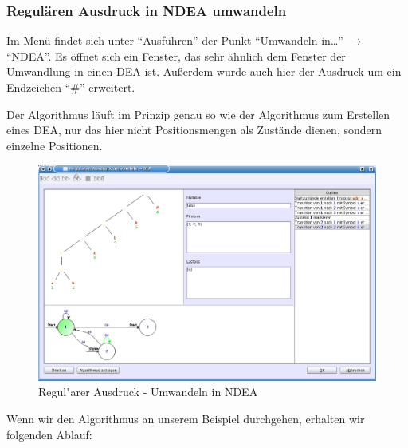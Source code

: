 \subsubsection{Regulären Ausdruck in NDEA umwandeln}

Im Menü findet sich unter "`Ausführen"' der Punkt "`Umwandeln in\ldots"' $\rightarrow$"`NDEA"'. Es öffnet sich ein Fenster, das sehr ähnlich dem Fenster der Umwandlung in einen DEA ist. Außerdem wurde auch hier der Ausdruck um ein Endzeichen "`\#"' erweitert.

Der Algorithmus läuft im Prinzip genau so wie der Algorithmus zum Erstellen eines DEA, nur das hier nicht Positionsmengen als Zustände dienen, sondern einzelne Positionen.

\begin{figure}[h]
\begin{center}
\includegraphics[width=12cm]{../images/regex_to_nfa.png}
\caption{Regul"arer Ausdruck - Umwandeln in NDEA}
\end{center}
\end{figure}

Wenn wir den Algorithmus an unserem Beispiel durchgehen, erhalten wir folgenden Ablauf:

